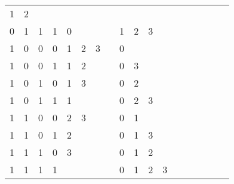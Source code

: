 \begin{table}[htbp]
\begin{minipage}{.4\textwidth}
\begin{tabular}{cccccccccccccccccc}
			\multicolumn{1}{c}{1} & \multicolumn{1}{c}{2} & \multicolumn{1}{c}{}& \multicolumn{1}{c}{} \\
			\multicolumn{1}{c}{0} & \multicolumn{1}{c}{1} & \multicolumn{1}{c}{1} & \multicolumn{1}{c}{1} & \multicolumn{1}{|c}{0} & \multicolumn{1}{c}{} & \multicolumn{1}{c}{}& \multicolumn{1}{c}{} &
			\multicolumn{1}{c}{1} & \multicolumn{1}{c}{2} & \multicolumn{1}{c}{3}& \multicolumn{1}{c}{} \\
			\multicolumn{1}{c}{1} & \multicolumn{1}{c}{0} & \multicolumn{1}{c}{0} & \multicolumn{1}{c}{0} & \multicolumn{1}{|c}{1} & \multicolumn{1}{c}{2} & \multicolumn{1}{c}{3}& \multicolumn{1}{c}{} &
			\multicolumn{1}{c}{0} & \multicolumn{1}{c}{} & \multicolumn{1}{c}{}& \multicolumn{1}{c}{} \\
			\multicolumn{1}{c}{1} & \multicolumn{1}{c}{0} & \multicolumn{1}{c}{0} & \multicolumn{1}{c}{1} & \multicolumn{1}{|c}{1} & \multicolumn{1}{c}{2} & \multicolumn{1}{c}{}& \multicolumn{1}{c}{} &
			\multicolumn{1}{c}{0} & \multicolumn{1}{c}{3} & \multicolumn{1}{c}{}& \multicolumn{1}{c}{} \\
			\multicolumn{1}{c}{1} & \multicolumn{1}{c}{0} & \multicolumn{1}{c}{1} & \multicolumn{1}{c}{0} & \multicolumn{1}{|c}{1} & \multicolumn{1}{c}{3} & \multicolumn{1}{c}{}& \multicolumn{1}{c}{} &
			\multicolumn{1}{c}{0} & \multicolumn{1}{c}{2} & \multicolumn{1}{c}{}& \multicolumn{1}{c}{} \\
			\multicolumn{1}{c}{1} & \multicolumn{1}{c}{0} & \multicolumn{1}{c}{1} & \multicolumn{1}{c}{1} & \multicolumn{1}{|c}{1} & \multicolumn{1}{c}{} & \multicolumn{1}{c}{}& \multicolumn{1}{c}{} &
			\multicolumn{1}{c}{0} & \multicolumn{1}{c}{2} & \multicolumn{1}{c}{3}& \multicolumn{1}{c}{} \\
			\multicolumn{1}{c}{1} & \multicolumn{1}{c}{1} & \multicolumn{1}{c}{0} & \multicolumn{1}{c}{0} & \multicolumn{1}{|c}{2} & \multicolumn{1}{c}{3} & \multicolumn{1}{c}{}& \multicolumn{1}{c}{} &
			\multicolumn{1}{c}{0} & \multicolumn{1}{c}{1} & \multicolumn{1}{c}{}& \multicolumn{1}{c}{} \\
			\multicolumn{1}{c}{1} & \multicolumn{1}{c}{1} & \multicolumn{1}{c}{0} & \multicolumn{1}{c}{1} & \multicolumn{1}{|c}{2} & \multicolumn{1}{c}{} & \multicolumn{1}{c}{}& \multicolumn{1}{c}{} &
			\multicolumn{1}{c}{0} & \multicolumn{1}{c}{1} & \multicolumn{1}{c}{3}& \multicolumn{1}{c}{} \\
			\multicolumn{1}{c}{1} & \multicolumn{1}{c}{1} & \multicolumn{1}{c}{1} & \multicolumn{1}{c}{0} & \multicolumn{1}{|c}{3} & \multicolumn{1}{c}{} & \multicolumn{1}{c}{}& \multicolumn{1}{c}{} &
			\multicolumn{1}{c}{0} & \multicolumn{1}{c}{1} & \multicolumn{1}{c}{2}& \multicolumn{1}{c}{} \\
			\multicolumn{1}{c}{1} & \multicolumn{1}{c}{1} & \multicolumn{1}{c}{1} & \multicolumn{1}{c}{1} & \multicolumn{1}{|c}{} & \multicolumn{1}{c}{} & \multicolumn{1}{c}{}& \multicolumn{1}{c}{} &
			\multicolumn{1}{c}{0} & \multicolumn{1}{c}{1} & \multicolumn{1}{c}{2}& \multicolumn{1}{c}{3} \\
			

\end{tabular}
\end{minipage}
\end{table}
